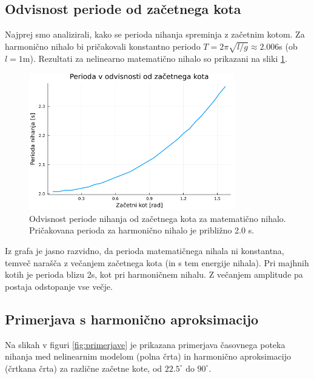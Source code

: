 \documentclass{article}
\begin{document}
\subsection{Odvisnost periode od začetnega kota}
Najprej smo analizirali, kako se perioda nihanja spreminja z začetnim kotom. Za harmonično 
nihalo bi pričakovali konstantno periodo $T = 2\pi\sqrt{l/g} \approx 2.006$s (ob $l = 1$m). 
Rezultati za nelinearno matematično nihalo so prikazani na sliki \ref{fig:perioda}.

\begin{figure}[h!]
    \centering
    \includegraphics[width=0.8\textwidth]{../slike/perioda_vs_kot.png}
    \caption{Odvisnost periode nihanja od začetnega kota za matematično nihalo. Pričakovana perioda 
    za harmonično nihalo je približno 2.0 s.}
    \label{fig:perioda}
\end{figure}

Iz grafa je jasno razvidno, da perioda matematičnega nihala ni konstantna, temveč narašča z večanjem 
začetnega kota (in s tem energije nihala). Pri majhnih kotih je perioda blizu 2s, kot pri harmoničnem nihalu. 
Z večanjem amplitude pa postaja odstopanje vse večje.

\subsection{Primerjava s harmonično aproksimacijo}
Na slikah v figuri \ref{fig:primerjave} je prikazana primerjava časovnega poteka nihanja med nelinearnim 
modelom (polna črta) in harmonično aproksimacijo (črtkana črta) za različne začetne kote, od $22.5^\circ$ do $90^\circ$.
\end{document}
